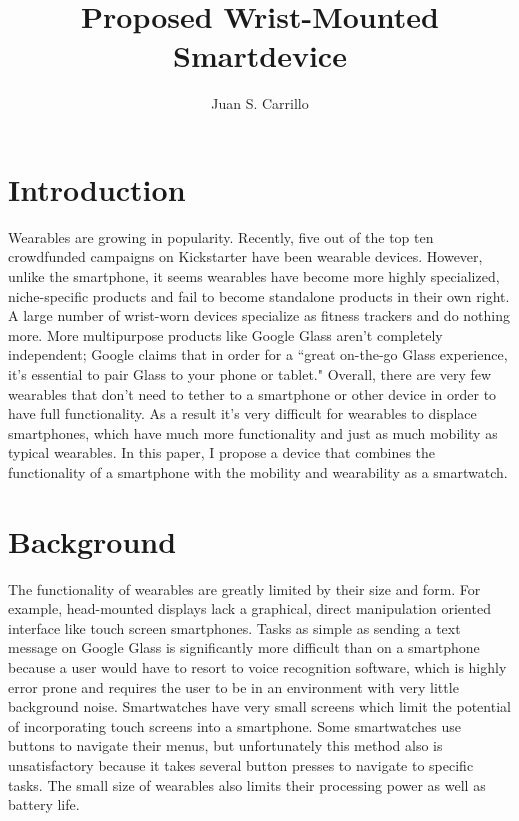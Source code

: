 \documentclass[11pt]{article}
\title{Proposed Wrist-Mounted Smartdevice}
\author{Juan S. Carrillo}
\begin{document}
\maketitle
\section{Introduction}
Wearables are growing in popularity. Recently, five out of the top ten crowdfunded campaigns on Kickstarter have been wearable devices. However, unlike the smartphone, it seems wearables have become more highly specialized, niche-specific products and fail to become standalone products in their own right. A large number of wrist-worn devices specialize as fitness trackers and do nothing more. More multipurpose products like Google Glass aren't completely independent; Google claims that in order for a ``great on-the-go Glass experience, it's essential to pair Glass to your phone or tablet." Overall, there are very few wearables that don't need to tether to a smartphone or other device in order to have full functionality. As a result it's very difficult for wearables to displace smartphones, which have much more functionality and just as much mobility as typical wearables. In this paper, I propose a device that combines the functionality of a smartphone with the mobility and wearability as a smartwatch.

\section{Background}
The functionality of wearables are greatly limited by their size and form. For example, head-mounted displays lack a graphical, direct manipulation oriented interface like touch screen smartphones. Tasks as simple as sending a text message on Google Glass is significantly more difficult than on a smartphone because a user would have to resort to voice recognition software, which is highly error prone and requires the user to be in an environment with very little background noise. Smartwatches have very small screens which limit the potential of incorporating touch screens into a smartphone. Some smartwatches use buttons to navigate their menus, but unfortunately this method also is unsatisfactory because it takes several button presses to navigate to specific tasks. The small size of wearables also limits their processing power as well as battery life. 
\end{document}
